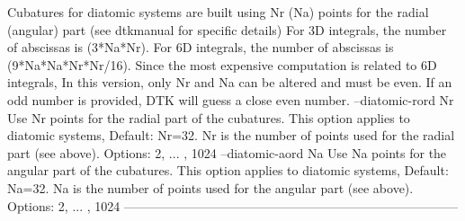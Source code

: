          Cubatures for diatomic systems are built using Nr (Na) points
       for the radial (angular) part (see dtkmanual for specific details)
            For 3D integrals, the number of abscissas is (3*Na*Nr).
        For 6D integrals, the number of abscissas is (9*Na*Na*Nr*Nr/16).
        Since the most expensive computation is related to 6D integrals,
           In this version, only Nr and Na can be altered and must be
           even. If an odd number is provided, DTK will guess a close
                                  even number.
  --diatomic-rord Nr 	Use Nr points for the radial part of the cubatures.
                     	  This option applies to diatomic systems, Default: Nr=32.
                     	  Nr is the number of points used for the radial part (see above).
                     	  Options: 2, ... , 1024
  --diatomic-aord Na 	Use Na points for the angular part of the cubatures.
                     	  This option applies to diatomic systems, Default: Na=32.
                     	  Na is the number of points used for the angular part (see above).
                     	  Options: 2, ... , 1024
--------------------------------------------------------------------------------
